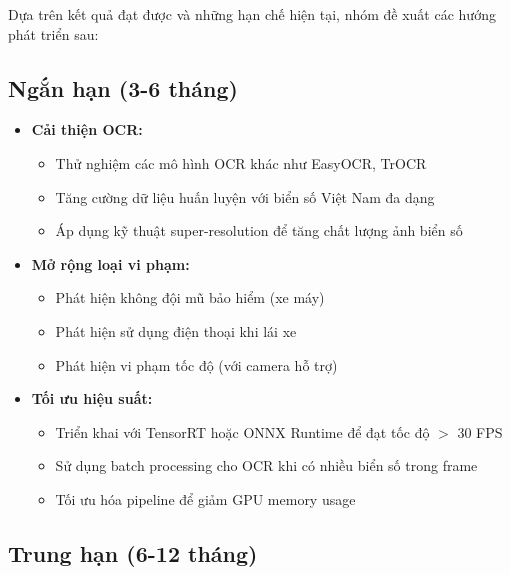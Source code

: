 Dựa trên kết quả đạt được và những hạn chế hiện tại, nhóm đề xuất các hướng phát triển sau:

\subsection{Ngắn hạn (3-6 tháng)}

\begin{itemize}
    \item \textbf{Cải thiện OCR:}
    \begin{itemize}
        \item Thử nghiệm các mô hình OCR khác như EasyOCR, TrOCR
        \item Tăng cường dữ liệu huấn luyện với biển số Việt Nam đa dạng
        \item Áp dụng kỹ thuật super-resolution để tăng chất lượng ảnh biển số
    \end{itemize}
    
    \item \textbf{Mở rộng loại vi phạm:}
    \begin{itemize}
        \item Phát hiện không đội mũ bảo hiểm (xe máy)
        \item Phát hiện sử dụng điện thoại khi lái xe
        \item Phát hiện vi phạm tốc độ (với camera hỗ trợ)
    \end{itemize}
    
    \item \textbf{Tối ưu hiệu suất:}
    \begin{itemize}
        \item Triển khai với TensorRT hoặc ONNX Runtime để đạt tốc độ $>$ 30 FPS
        \item Sử dụng batch processing cho OCR khi có nhiều biển số trong frame
        \item Tối ưu hóa pipeline để giảm GPU memory usage
    \end{itemize}
\end{itemize}

\subsection{Trung hạn (6-12 tháng)}

